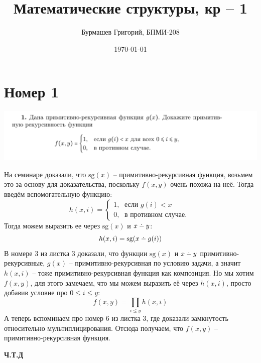 \documentclass[a4paper,12pt]{article}
\author{Бурмашев Григорий, БПМИ-208}
\title{Математические структуры, кр -- 1}
\date{\today}
\begin{document}
\maketitle
\section*{Номер 1}
\begin{center}
\includegraphics[scale=0.4]{1.png}
\end{center}
\def\dotminus{\mathbin{\ooalign{\hss\raise1ex\hbox{.}\hss\cr
  \mathsurround=0pt$-$}}}
На семинаре доказали, что $\text{sg}(x)$ --  примитивно-рекурсивная функция, возьмем это за основу для доказательства, поскольку $f(x, y)$ очень похожа на неё. Тогда введём вспомогательную функцию:
\[
h(x, i) = \begin{cases}
1, \; \text{ если } g(i) < x \\
0, \; \text{ в противном случае. } 
\end{cases}
\]
Тогда можем выразить ее через  $\text{sg}(x)$ и $x \dotminus y$:
\[
h(x, i) = \text{sg} (x \dotminus g(i))
\] 
В номере 3 из листка 3 доказали, что функции $\text{sg}(x)$ и  $x \dotminus y$ примитивно-рекурсивные, $g(x)$ -- примитивно-рекурсивная по условию задачи, а значит $h(x, i)$ -- тоже примитивно-рекурсивная функция как композиция. Но мы хотим $f(x, y)$, для этого замечаем, что мы можем выразить её через $h(x, i)$, просто добавив условие про $ 0 \leq i \leq y$:
\[
f(x, y) = \prod_{i \leq y} h(x, i)
\]
А теперь вспоминаем про номер 6 из листка 3,  где доказали замкнутость относительно мультиплицирования. 
Отсюда получаем, что $f(x, y)$ -- примитивно-рекурсивная функция.
\begin{center}
\textbf{Ч.Т.Д} 
\end{center}
\clearpage
\end{document}
